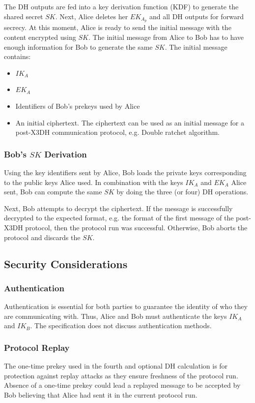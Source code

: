 The DH outputs are fed into a key derivation function (KDF) to generate the shared secret $ SK $. Next, Alice deletes her $ EK_{A_{p}}$ and all DH outputs for forward secrecy. At this moment, Alice is ready to send the initial message with the content encrypted using $ SK $. The initial message from Alice to Bob has to have enough information for Bob to generate the same $ SK $.
The initial message contains:
\begin{itemize}\setlength\itemsep{-0.3em}
	\item $ IK_{A} $
	\item $ EK_{A} $
	\item Identifiers of Bob's prekeys used by Alice
	\item An initial ciphertext. The ciphertext can be used as an initial message for a post-X3DH communication protocol, e.g. Double ratchet algorithm.
\end{itemize}
\subsubsection{Bob's $ SK $ Derivation}
Using the key identifiers sent by Alice, Bob loads the private keys corresponding to the public keys Alice used. In combination with the keys $ IK_{A} $ and $ EK_{A} $ Alice sent, Bob can compute the same $ SK $ by doing the three (or four) DH operations.
\par
Next, Bob attempts to decrypt the ciphertext. If the message is successfully decrypted to the expected format, e.g. the format of the first message of the post-X3DH protocol, then the protocol run was successful. Otherwise, Bob aborts the protocol and discards the $ SK $.
\subsection{Security Considerations}
\subsubsection{Authentication}
Authentication is essential for both parties to guarantee the identity of who they are communicating with. Thus, Alice and Bob must authenticate the keys $ IK_{A} $ and $ IK_{B} $. The specification does not discuss authentication methods.
\subsubsection{Protocol Replay}
The one-time prekey used in the fourth and optional DH calculation is for protection against replay attacks as they ensure freshness of the protocol run. Absence of a one-time prekey could lead a replayed message to be accepted by Bob believing that Alice had sent it in the current protocol run.
